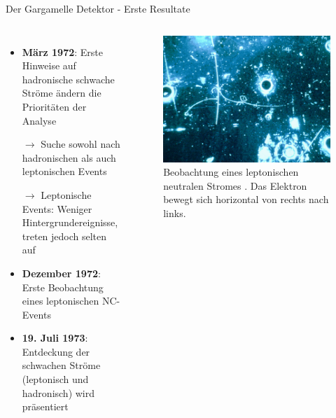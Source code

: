 \documentclass[aspectratio=1610, professionalfonts, 10pt]{beamer}
\begin{document}
\begin{frame}{Der Gargamelle Detektor - Erste Resultate}
	\begin{columns}
				\begin{itemize}
					\setlength\itemsep{0.5em}
					\item \textbf{März 1972}: Erste Hinweise auf hadronische schwache Ströme ändern die Prioritäten der Analyse
					\item[$\rightarrow$] Suche sowohl nach hadronischen als auch leptonischen Events
					\item[$\rightarrow$] Leptonische Events: Weniger Hintergrundereignisse, treten jedoch selten auf
					\item \textbf{Dezember 1972}: Erste Beobachtung eines leptonischen NC-Events
					\item \textbf{19. Juli 1973}: Entdeckung der schwachen Ströme (leptonisch und hadronisch) wird präsentiert
				\end{itemize}

			\begin{figure}
	  			\centering
				\includegraphics[width=\linewidth]{Images/60100_bearbeitet.png}
	  			\caption{Beobachtung eines leptonischen neutralen Stromes \cite{CERN-EX-60100}. Das Elektron bewegt sich horizontal von rechts nach links.}
	  			\label{fig:feynman}
			\end{figure}
	\end{columns}
\end{frame}
\end{document}
